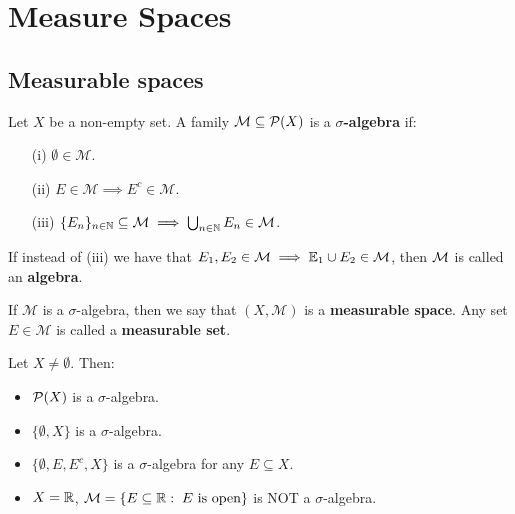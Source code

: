 \chapter{Measure Spaces}

\section{Measurable spaces}

\begin{fdefinition}
    Let $X$ be a non-empty set. A family $\mathcal{M} \subseteq \mathcal{P}(X)$ is a
    \textbf{$\sigma$-algebra} if:

    \vspace{1em}

    \begin{enumerate}
        \item[(i)] $\emptyset \in \mathcal{M}$.
        \vspace{1em}
        \item[(ii)] $E \in \mathcal{M} \implies E^c \in \mathcal{M}$.
        \vspace{1em}
        \item[(iii)] $\{E_n\}_{n \in \mathbb{N}} \subseteq \mathcal{M} \implies \bigcup_{n \in \mathbb{N}} E_n \in \mathcal{M}$.
    \end{enumerate}

    \vspace{1em}

    If instead of (iii) we have that $E_1, E_2 \in \mathcal{M} \implies \mathbb{E}_1 \cup E_2 \in \mathcal{M}$, then
    $\mathcal{M}$ is called an \textbf{algebra}.

\end{fdefinition}

\begin{fremark}
    If $\mathcal{M}$ is a $\sigma$-algebra, then we say that $(X, \mathcal{M})$ is a
    \textbf{measurable space}. Any set $E \in \mathcal{M}$ is called a
    \textbf{measurable set}.
\end{fremark}

\begin{example}
    Let $X \neq \emptyset$. Then:

    \begin{itemize}
        \item $\mathcal{P}(X)$ is a $\sigma$-algebra.
        \item $\{\emptyset, X\}$ is a $\sigma$-algebra.
        \item $\{\emptyset, E, E^c, X\}$ is a $\sigma$-algebra for any $E \subseteq X$.
        \item $X = \mathbb{R}$, $\mathcal{M} = \{E \subseteq \mathbb{R}: \; E \text{ is open}\}$ is NOT a $\sigma$-algebra.
    \end{itemize}
\end{example}

